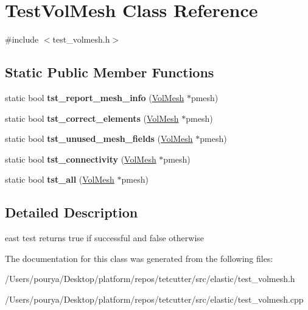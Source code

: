 \hypertarget{classTestVolMesh}{}\section{Test\+Vol\+Mesh Class Reference}
\label{classTestVolMesh}


{\ttfamily \#include $<$test\+\_\+volmesh.\+h$>$}

\subsection*{Static Public Member Functions}
\begin{DoxyCompactItemize}
\item 
\hypertarget{classTestVolMesh_ae7c56f222fdb00faff52323b70037e02}{}static bool {\bfseries tst\+\_\+report\+\_\+mesh\+\_\+info} (\hyperlink{classps_1_1elastic_1_1VolMesh}{Vol\+Mesh} $\ast$pmesh)\label{classTestVolMesh_ae7c56f222fdb00faff52323b70037e02}

\item 
\hypertarget{classTestVolMesh_adf86e87d03fd709a3233ba6ade481e27}{}static bool {\bfseries tst\+\_\+correct\+\_\+elements} (\hyperlink{classps_1_1elastic_1_1VolMesh}{Vol\+Mesh} $\ast$pmesh)\label{classTestVolMesh_adf86e87d03fd709a3233ba6ade481e27}

\item 
\hypertarget{classTestVolMesh_a5f09f5fcdc090dea6546dd5a61f09d11}{}static bool {\bfseries tst\+\_\+unused\+\_\+mesh\+\_\+fields} (\hyperlink{classps_1_1elastic_1_1VolMesh}{Vol\+Mesh} $\ast$pmesh)\label{classTestVolMesh_a5f09f5fcdc090dea6546dd5a61f09d11}

\item 
\hypertarget{classTestVolMesh_a4a7a6065a4ea132b0051c75bce5e3c1c}{}static bool {\bfseries tst\+\_\+connectivity} (\hyperlink{classps_1_1elastic_1_1VolMesh}{Vol\+Mesh} $\ast$pmesh)\label{classTestVolMesh_a4a7a6065a4ea132b0051c75bce5e3c1c}

\item 
\hypertarget{classTestVolMesh_abf1d48aa5a81d47d5707953c5307b3d3}{}static bool {\bfseries tst\+\_\+all} (\hyperlink{classps_1_1elastic_1_1VolMesh}{Vol\+Mesh} $\ast$pmesh)\label{classTestVolMesh_abf1d48aa5a81d47d5707953c5307b3d3}

\end{DoxyCompactItemize}


\subsection{Detailed Description}
east test returns true if successful and false otherwise 

The documentation for this class was generated from the following files\+:\begin{DoxyCompactItemize}
\item 
/\+Users/pourya/\+Desktop/platform/repos/tetcutter/src/elastic/test\+\_\+volmesh.\+h\item 
/\+Users/pourya/\+Desktop/platform/repos/tetcutter/src/elastic/test\+\_\+volmesh.\+cpp\end{DoxyCompactItemize}
